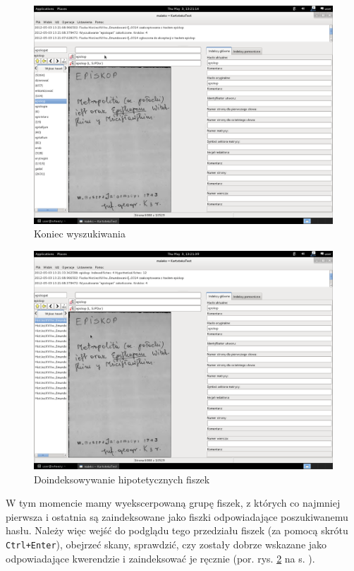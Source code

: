 \documentclass[12pt,oneside,notitlepage,titleauthor]{mwart}%
\begin{document}
\begin{figure}[h]
\includegraphics[scale=0.3]{09episkop_koniec.png}
\caption{Koniec wyszukiwania}
\label{09episkop_koniec}
\end{figure}

\begin{figure}[h]
\includegraphics[scale=0.3]{10doindeksowanie.png}
\caption{Doindeksowywanie hipotetycznych fiszek}
\label{10doindeksowanie}
\end{figure}


W tym momencie mamy wyekscerpowaną grupę fiszek, z których co najmniej pierwsza i ostatnia są zaindeksowane jako fiszki odpowiadające poszukiwanemu hasłu. Należy więc wejść do podglądu tego przedziału fiszek (za pomocą skrótu \texttt{Ctrl+Enter}), obejrzeć skany, sprawdzić, czy zostały dobrze wskazane jako odpowiadające kwerendzie i zaindeksować je ręcznie (por. rys. \ref{10doindeksowanie} na s. \pageref{10doindeksowanie}).
\end{document}
